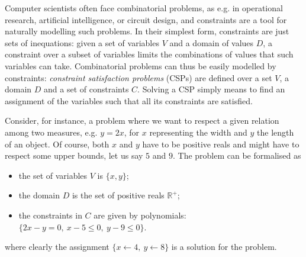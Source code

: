 \documentclass{llncs}
\begin{document}
Computer scientists often face combinatorial problems, as e.g. in operational research, artificial intelligence, or circuit design,
and constraints are a tool for naturally modelling such problems. %
In their simplest form, constraints are just sets of inequations: %
given a set of variables $V$ and a domain of values $D$, 
a constraint over a subset of variables limits the combinations of values that such variables can take. 
Combinatorial problems can thus be easily modelled by constraints: \emph{constraint satisfaction problems} (CSPs)
are defined over a set $V$, a domain $D$ and a set of constraints $C$. Solving a CSP
simply means to find an assignment of the variables such that all its constraints are satisfied. 

\begin{samepage}
Consider, for instance, a problem where we want to respect a given relation among two measures, e.g. $y = 2x$, for $x$ representing the width and $y$ the length of an object. 
Of course, both $x$ and $y$ have to be positive reals and might have to respect some upper bounds, let us say $5$ and $9$. The problem can be formalised as
\begin{itemize}
	\item the set of variables $V$ is $\{x,y\}$;
	\item the domain $D$ is the set of positive reals $\mathbb{R}^+$;
	\item the constraints in $C$ are given by polynomials: $\{2x-y = 0, \ x-5 \leq 0, \ y-9 \leq 0\}$.
\end{itemize}
\noindent
where clearly the assignment $\{x \leftarrow 4, \ y \leftarrow 8\}$ is a solution for the problem.
\end{samepage}
\end{document}
